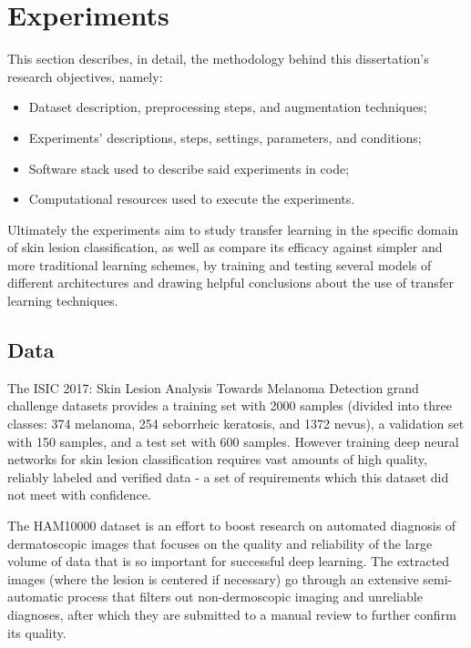 \chapter{Experiments}
\label{chapter:experiments}

This section describes, in detail, the methodology behind this dissertation's research objectives, namely:

\begin{itemize}
    \item Dataset description, preprocessing steps, and augmentation techniques;
    \item Experiments' descriptions, steps, settings, parameters, and conditions;
    \item Software stack used to describe said experiments in code;
    \item Computational resources used to execute the experiments.
\end{itemize}

Ultimately the experiments aim to study transfer learning in the specific domain of skin lesion classification, as well as compare its efficacy against simpler and more traditional learning schemes, by training and testing several models of different architectures and drawing helpful conclusions about the use of transfer learning techniques.

\section{Data}

The \ac{ISIC} 2017: Skin Lesion Analysis Towards Melanoma Detection grand challenge datasets \cite{isic2017} provides a training set with 2000 samples (divided into three classes: 374 melanoma, 254 seborrheic keratosis, and 1372 nevus), a validation set with 150 samples, and a test set with 600 samples. However training deep neural networks for skin lesion classification requires vast amounts of high quality, reliably labeled and verified data - a set of requirements which this dataset did not meet with confidence.

The \ac{HAM10000} \cite{ham10000} dataset is an effort to boost research on automated diagnosis of dermatoscopic images that focuses on the quality and reliability of the large volume of data that is so important for successful deep learning. The extracted images (where the lesion is centered if necessary) go through an extensive semi-automatic process that filters out non-dermoscopic imaging and unreliable diagnoses, after which they are submitted to a manual review to further confirm its quality.

